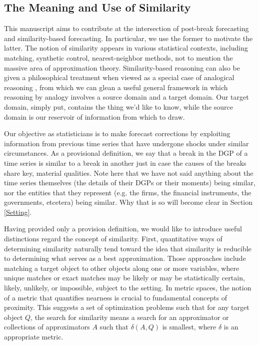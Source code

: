 \documentclass[11pt]{article}
\theoremstyle{definition}
\begin{document}
  \subsection{The Meaning and Use of Similarity}
This manuscript aims to contribute at the intersection of post-break forecasting and similarity-based forecasting.  In particular, we use the former to motivate the latter.  The notion of similarity appears in various statistical contexts, including matching, synthetic control, nearest-neighbor methods, not to mention the massive area of approximation theory.  Similarity-based reasoning can also be given a philosophical treatment when viewed as a special case of analogical reasoning \citep{bartha2013analogy}, from which we can glean a useful general framework in which reasoning by analogy involves a source domain and a target domain.  Our target domain, simply put, contains the thing we'd like to know, while the source domain is our reservoir of information from which to draw.  

Our objective as statisticians is to make forecast corrections by exploiting information from previous time series that have undergone shocks under similar circumstances.  As a provisional definition, we say that a break in the DGP of a time series is similar to a break in another just in case the causes of the breaks share key, material qualities.  Note here that we have not said anything about the time series themselves (the details of their DGPs or their moments) being similar, nor the entities that they represent (e.g. the firms, the financial instruments, the governments, etcetera) being similar.  Why that is so will become clear in Section \ref{Setting}.

Having provided only a provision definition, we would like to introduce useful distinctions regard the concept of similarity.  First, quantitative ways of determining similarity naturally tend toward the idea that similarity is reducible to determining what serves as a best approximation.  Those approaches include matching a target object to other objects along one or more variables, where unique matches or exact matches may be likely or may be statistically certain, likely, unlikely, or impossible, subject to the setting.  In metric spaces, the notion of a metric that quantifies nearness is crucial to fundamental concepts of proximity.  This suggests a set of optimization problems such that for any target object $Q$, the search for similarity means a search for an approximator or collections of approximators $A$ such that $\delta(A,Q)$ is smallest, where $\delta$ is an appropriate metric.
\end{document}
